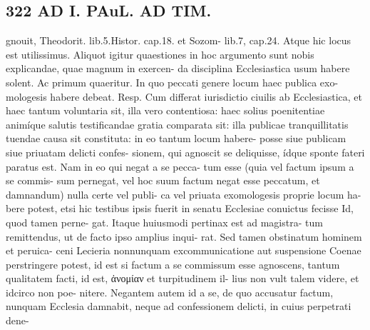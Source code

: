 \documentclass{article}
\begin{document}
\begin{pages}
\section*{322 AD I. PAuL. AD TIM. }gnouit, Theodorit. lib.5.Histor. cap.18. et Sozom- lib.7, cap.24. Atque hic locus est utilissimus. Aliquot igitur quaestiones in hoc argumento sunt nobis explicandae, quae magnum in exercen- da disciplina Ecclesiastica usum habere solent. Ac primum quaeritur. In quo peccati genere locum haec publica exo- mologesis habere debeat. Resp. Cum differat iurisdictio ciuilis ab Ecclesiastica, et haec tantum voluntaria sit, illa vero contentiosa: haec solius poenitentiae animíque salutis testificandae gratia comparata sit: illa publicae tranquillitatis tuendae causa sit constituta: in eo tantum locum habere- posse siue publicam siue priuatam delicti confes- sionem, qui agnoscit se deliquisse, ídque sponte fateri paratus est. Nam in eo qui negat a se pecca- tum esse (quia vel factum ipsum a se commis- sum pernegat, vel hoc suum factum negat esse peccatum, et damnandum) nulla certe vel publi- ca vel priuata exomologesis proprie locum ha- bere potest, etsi hic testibus ipsis fuerit in senatu Ecclesiae conuictus fecisse Id, quod tamen perne- gat. Itaque huiusmodi pertinax est ad magistra- tum remittendus, ut de facto ipso amplius inqui- rat. Sed tamen obstinatum hominem et peruica- ceni Lecieria nonnunquam excommunicatione aut suspensione Coenae perstringere potest, id est si factum a se commissum esse agnoscens, tantum qualitatem facti, id est, ἀνομίαν et turpitudinem il- lius non vult talem videre, et idcirco non poe- nitere. Negantem autem id a se, de quo accusatur factum, nunquam Ecclesia damnabit, neque ad confessionem delicti, in cuius perpetrati dene- 

\end{pages}
\end{document}
